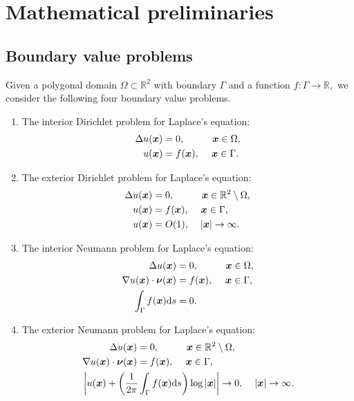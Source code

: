 \section{Mathematical preliminaries}
\subsection{Boundary value problems}
Given a polygonal domain  $\Omega \subset \mathbb{R}^2$ with boundary $\Gamma$ and a function
$f: \Gamma \to \mathbb{R},$ we consider 
the following four boundary value problems. 

\begin{enumerate}
\item The interior Dirichlet problem for Laplace's equation:
\begin{align}\label{eqn:BVPIDL}
\Delta u(\boldsymbol{x}) &= 0, \hspace{1 cm} \boldsymbol{x} \in \Omega,\\
u(\boldsymbol{x}) &= f(\boldsymbol{x}), \hspace{0.43 cm} \boldsymbol{x} \in \Gamma.
\end{align}

\item The exterior Dirichlet problem for Laplace's equation:
\begin{align}\label{eqn:BVPEDL}
\Delta u(\boldsymbol{x}) &= 0, \hspace{1 cm} \boldsymbol{x} \in \mathbb{R}^2\setminus\Omega,\\
u(\boldsymbol{x}) &= f(\boldsymbol{x}), \hspace{0.43 cm}\boldsymbol{x} \in \Gamma, \\
u(\boldsymbol{x}) &= O(1) , \hspace{0.4cm} |\boldsymbol{x}| \to \infty.
\end{align}

\item The interior Neumann problem for Laplace's equation:
\begin{align}\label{eqn:BVPINL}
\Delta u(\boldsymbol{x}) &= 0, \hspace{1 cm} \boldsymbol{x} \in \Omega,\\
\nabla u(\boldsymbol{x})\cdot \boldsymbol{\nu}(\boldsymbol{x})  &= f(\boldsymbol{x}), \hspace{0.45 cm} \boldsymbol{x} \in \Gamma,\\
\int_\Gamma f(\boldsymbol{x}) {\rm d}s &= 0.
\end{align}

\item The exterior Neumann problem for Laplace's equation:
\begin{align}\label{eqn:BVPEDL}
\Delta u(\bx) &= 0, \hspace{1 cm} \bx \in \mathbb{R}^2\setminus\Omega,\\
\nabla u(\bx)\cdot \bnu(\bx)  &= f(\bx), \hspace{0.43 cm} \bx \in \Gamma, \\
&\hspace{-2 cm}\left|u(\bx) + \left(\frac{1}{2\pi} \int_\Gamma f(\bx) {\rm d}s\right) \log{|\bx|}\right| \to 0 , \hspace{0.4cm} |\bx| \to \infty.
\end{align}


\end{enumerate}

